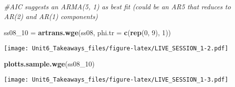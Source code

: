 \documentclass[
]{article}
\newenvironment{Shaded}{\begin{snugshade}}{\end{snugshade}}
\newcommand{\CommentTok}[1]{\textcolor[rgb]{0.56,0.35,0.01}{\textit{#1}}}
\newcommand{\DataTypeTok}[1]{\textcolor[rgb]{0.13,0.29,0.53}{#1}}
\newcommand{\DecValTok}[1]{\textcolor[rgb]{0.00,0.00,0.81}{#1}}
\newcommand{\KeywordTok}[1]{\textcolor[rgb]{0.13,0.29,0.53}{\textbf{#1}}}
\newcommand{\NormalTok}[1]{#1}
\newcommand{\StringTok}[1]{\textcolor[rgb]{0.31,0.60,0.02}{#1}}
\begin{document}
\begin{Shaded}
\begin{Highlighting}[]
\CommentTok{#AIC suggests an ARMA(5, 1) as best fit (could be an AR5 that reduces to AR(2) and AR(1) components)}

\NormalTok{ss08_}\DecValTok{10}\NormalTok{ =}\StringTok{ }\KeywordTok{artrans.wge}\NormalTok{(ss08, }\DataTypeTok{phi.tr =} \KeywordTok{c}\NormalTok{(}\KeywordTok{rep}\NormalTok{(}\DecValTok{0}\NormalTok{, }\DecValTok{9}\NormalTok{), }\DecValTok{1}\NormalTok{))}
\end{Highlighting}
\end{Shaded}

\texttt{[image: Unit6\_Takeaways\_files/figure-latex/LIVE\_SESSION\_1-2.pdf]}

\begin{Shaded}
\begin{Highlighting}[]
\KeywordTok{plotts.sample.wge}\NormalTok{(ss08_}\DecValTok{10}\NormalTok{)}
\end{Highlighting}
\end{Shaded}

\texttt{[image: Unit6\_Takeaways\_files/figure-latex/LIVE\_SESSION\_1-3.pdf]}
\end{document}
